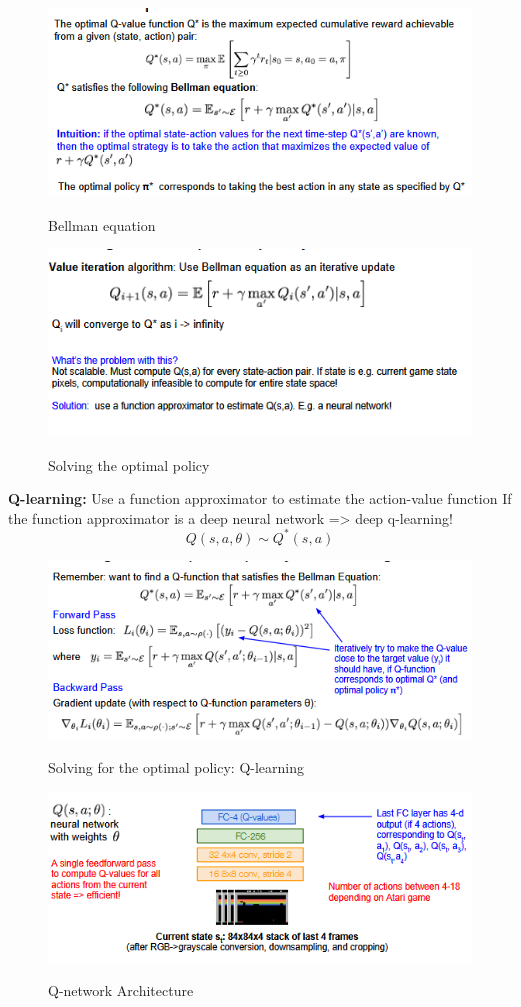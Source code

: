 \documentclass[11pt]{article}
\begin{document}
\begin{figure}[h]
\centering
\captionsetup{justification=centering}
\includegraphics[width=0.7\linewidth]{L1313.pdf}
\label{fig:L1313}
\caption{Bellman equation}
\end{figure}
\clearpage
\begin{figure}[h]
\centering
\captionsetup{justification=centering}
\includegraphics[width=0.7\linewidth]{L1314.pdf}
\label{fig:L1314}
\caption{Solving the optimal policy}
\end{figure}
\textbf{Q-learning:} Use a function approximator to estimate the action-value function If the function approximator is a deep neural network => deep q-learning!
\begin{equation}
Q(s,a,\theta) \sim Q^*(s,a)
\end{equation}{}
\begin{figure}[h]
\centering
\captionsetup{justification=centering}
\includegraphics[width=0.7\linewidth]{L1315.pdf}
\label{fig:L1315}
\caption{Solving for the optimal policy: Q-learning }
\end{figure}
\clearpage
\begin{figure}[h]
\centering
\captionsetup{justification=centering}
\includegraphics[width=0.6\linewidth]{L1316.pdf}
\label{fig:6}
\caption{Q-network Architecture }
\end{figure}
\end{document}
